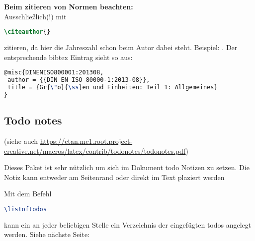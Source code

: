 \par
\textbf{Beim zitieren von Normen beachten:}\\
Ausschließlich(!) mit 
\begin{lstlisting}[language=tex]
\citeauthor{}
\end{lstlisting}
zitieren, da hier die Jahreszahl schon beim Autor dabei steht. Beispiel:
\citeauthor{DINENISO800001:201308}.
Der entsprechende bibtex Eintrag sieht so aus:
\begin{lstlisting}[language=tex]
@misc{DINENISO800001:201308,
 author = {{DIN EN ISO 80000-1:2013-08}},
 title = {Gr{\"o}{\ss}en und Einheiten: Teil 1: Allgemeines}
}
\end{lstlisting}
%
%
%
\subsection{Todo notes}
\label{sec:ToDoNotes}
%
(siehe auch \url{https://ctan.mc1.root.project-creative.net/macros/latex/contrib/todonotes/todonotes.pdf})
%
\par
Dieses Paket ist sehr nützlich um sich im Dokument todo Notizen zu setzen.
Die Notiz kann entweder am Seitenrand
oder direkt im Text plaziert werden
\par
Mit dem Befehl
\begin{lstlisting}[language=tex]
\listoftodos
\end{lstlisting} 
kann ein an jeder beliebigen Stelle ein Verzeichnis der eingefügten todos angelegt werden.
Siehe nächste Seite:
\listoftodos